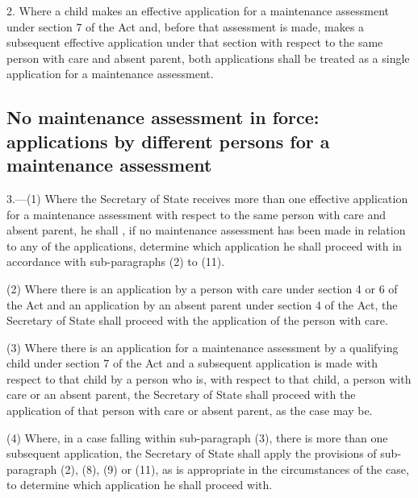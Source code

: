 \documentclass[a4paper,12pt]{article}
\begin{document}
2.  Where a child makes an effective application for a maintenance assessment under section 7 of the Act and, before that assessment is made, makes a subsequent effective application under that section with respect to the same person with care and absent parent, both applications shall be treated as a single application for a maintenance assessment.

\subsection*{No maintenance assessment in force: applications by different persons for a maintenance assessment}

3.—(1) Where the Secretary of State receives more than one effective application for a maintenance assessment with respect to the same person with care and absent parent, he shall%
, if no maintenance assessment has been made in relation to any of the applications,  %
determine which application he shall proceed with in accordance with sub-paragraphs (2) to (11).

(2) Where there is an application by a person with care under section 4 or 6 of the Act and an application by an absent parent under section 4 of the Act, 
the Secretary of State  %
shall proceed with the application of the person with care.

(3) Where there is an application for a maintenance assessment by a qualifying child under section 7 of the Act and a subsequent application is made with respect to that child by a person who is, with respect to that child, a person with care or an absent parent, 
the Secretary of State  %
shall proceed with the application of that person with care or absent parent, as the case may be.

(4) Where, in a case falling within sub-paragraph (3), there is more than one subsequent application, 
the Secretary of State  %
shall apply the provisions of sub-paragraph (2), (8), (9) or (11), as is appropriate in the circumstances of the case, to determine which application he shall proceed with.
\end{document}
